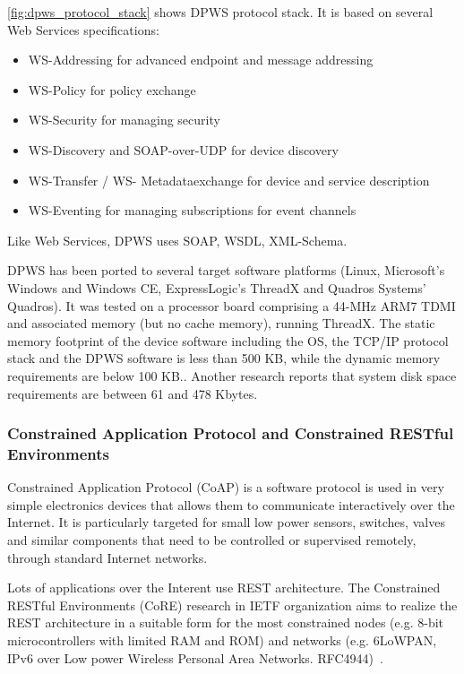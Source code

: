 \autoref{fig:dpws_protocol_stack} shows DPWS protocol stack. It is based on  
several Web Services specifications\cite{ws4d_dpws}:
\begin{itemize}
  \item WS-Addressing for advanced endpoint and message addressing
  \item WS-Policy for policy exchange
  \item WS-Security for managing security
  \item WS-Discovery and SOAP-over-UDP for device discovery
  \item WS-Transfer / WS- Metadataexchange for device and service description
  \item WS-Eventing for managing subscriptions for event channels   
\end{itemize}
    
Like Web Services, DPWS uses SOAP, WSDL, XML-Schema. 


DPWS has been ported to several target software
platforms (Linux, Microsoft's Windows and Windows CE,
ExpressLogic's ThreadX and Quadros Systems' Quadros).
It was tested on a processor board comprising a 44-MHz ARM7
TDMI and associated memory (but no cache memory), running
ThreadX. The static memory footprint of the device software including
the OS, the TCP/IP protocol stack and the DPWS software is
less than 500 KB, while the dynamic memory requirements are
below 100 KB.\cite{4221180}.    
Another research \cite{5470528} reports that system disk space
requirements are between 61 and 478 Kbytes. 



\subsubsection{Constrained Application Protocol and Constrained RESTful Environments}
\label{sec:CoAP}

Constrained Application Protocol (CoAP) is a software protocol is
used in very simple electronics devices that allows them to communicate interactively over the Internet.
It is particularly targeted for small low power sensors, switches,
valves and similar components that need to be controlled or supervised remotely, through standard Internet networks.

Lots of applications over the Interent use REST architecture.
   The Constrained RESTful Environments (CoRE) research in IETF organization
   aims to realize the REST architecture in a suitable form for the most
   constrained nodes (e.g.  8-bit microcontrollers with limited RAM and ROM) and
   networks (e.g.  6LoWPAN, IPv6 over Low power Wireless Personal Area
   Networks. RFC4944)~\cite{coap_spec}.

